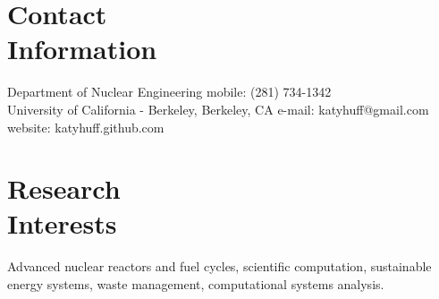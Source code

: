 \documentclass[margin,line]{resume}
\begin{document}
\begin{resume}

    \section{\mysidestyle Contact\\Information}

    Department of Nuclear Engineering                       \hfill mobile: (281) 734-1342           \vspace{0mm}\\\vspace{0mm}%
    University of California - Berkeley, Berkeley, CA       \hfill e-mail: katyhuff@gmail.com            \vspace{0mm}\\\vspace{0mm}%
                                                            \hfill website: katyhuff.github.com     \vspace{0mm}\\\vspace{-4.5mm}%
    \vspace{-3mm}
    \section{\mysidestyle Research\\Interests}
		Advanced nuclear reactors and fuel cycles, scientific 
                computation, sustainable energy systems, waste 
                management, computational systems analysis. %
    

\end{resume}
\end{document}
